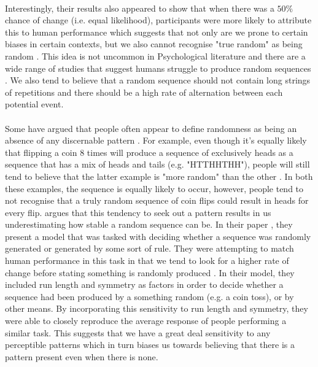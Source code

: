\documentclass[12pt]{article}
\begin{document}
\paragraph{} Interestingly, their results also appeared to show that when there was a $50\%$ chance of change (i.e. equal likelihood), participants were more likely to attribute this to human performance which suggests that not only are we prone to certain biases in certain contexts, but we also cannot recognise "true random" as being random \citep{Ayton2004}. This idea is not uncommon in Psychological literature and there are a wide range of studies that suggest humans struggle to produce random sequences \citep[see][for a review]{BARHILLEL1991428}. We also tend to believe that a random sequence should not contain long strings of repetitions and there should be a high rate of alternation between each potential event. 

\paragraph{} Some have argued that people often appear to define randomness as being an absence of any discernable pattern \citep{lopes1987distinguishing}. For example, even though it's equally likely that flipping a coin 8 times will produce a sequence of exclusively heads as a sequence that has a mix of heads and tails (e.g. "HTTHHTHH"), people will still tend to believe that the latter example is "more random" than the other \citep{KAHNEMAN1972430}. In both these examples, the sequence is equally likely to occur, however, people tend to not recognise that a truly random sequence of coin flips could result in heads for every flip. \cite{GRIFFITHS201885} argues that this tendency to seek out a pattern results in us underestimating how stable a random sequence can be. In their paper \citep{GRIFFITHS201885}, they present a model that was tasked with deciding whether a sequence was randomly generated or generated by some sort of rule. They were attempting to match human performance in this task in that we tend to look for a higher rate of change before stating something is randomly produced \citep{Ayton2004}. In their model, they included run length and symmetry as factors in order to decide whether a sequence had been produced by a something random (e.g. a coin toss), or by other means. By incorporating this sensitivity to run length and symmetry, they were able to closely reproduce the average response of people performing a similar task. This suggests that we have a great deal sensitivity to any perceptible patterns which in turn biases us towards believing that there is a pattern present even when there is none. 
\end{document}
